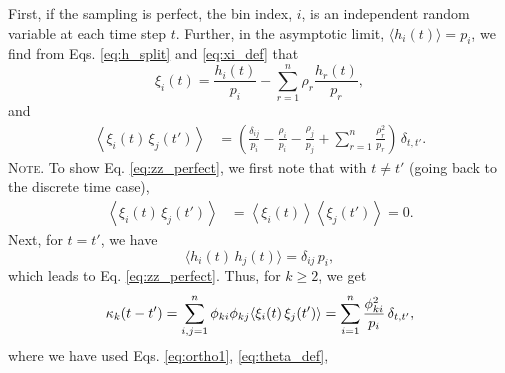 \documentclass[reprint, superscriptaddress, floatfix]{revtex4-1}
\newcommand{\note}[1]{{\color{DarkGreen}\footnotesize \textsc{Note.} #1}}
\begin{document}
First, if the sampling is perfect,
%
%
the bin index, $i$, is an independent random variable
at each time step $t$.
%
Further, in the asymptotic limit,
$\langle h_i(t) \rangle = p_i$,
we find from Eqs. \eqref{eq:h_split} and \eqref{eq:xi_def} that
\begin{equation*}
  \xi_i(t)
  =
  \frac{ h_i(t) } { p_i }
  -
  \sum_{ r = 1 }^n
    \rho_r \frac{ h_r(t) } { p_r }
  ,
\end{equation*}
%
and
%
\begin{align}
  \left\langle
    \xi_i(t) \, \xi_j(t')
  \right\rangle
  &=
  \left(
    \frac{ \delta_{ij} } { p_i }
    -
    \frac{ \rho_i } { p_i }
    -
    \frac{ \rho_j } { p_j }
    +
    \sum_{r = 1}^n
    \frac{ \rho_r^2 } { p_r }
  \right) \,
  \delta_{t, t'}
  .
\label{eq:zz_perfect}
\end{align}
%
%
\note{To show Eq. \eqref{eq:zz_perfect}, we first note that
  with $t \ne t'$ (going back to the discrete time case),
  $$
  \begin{aligned}
  \left\langle
    \xi_i(t) \, \xi_j(t')
  \right\rangle
  &=
  \left\langle
    \xi_i(t)
  \right\rangle
  \left\langle
    \xi_j(t')
  \right\rangle
  =
  0.
  \end{aligned}
  $$
  Next, for $t = t'$, we have
  $$
  \langle
    h_i(t) \, h_j(t)
  \rangle
  = \delta_{ij} \, p_i
  ,
  $$
  which leads to Eq. \eqref{eq:zz_perfect}.
}
%
Thus,
for $k \ge 2$, we get
%
\begin{equation}
  \kappa_k(t - t')
  =
  \sum_{i,j = 1}^n
  \phi_{ki} \phi_{kj}
  \langle \xi_i(t) \, \xi_j(t') \rangle
  =
  \sum_{i = 1}^n \frac{ \phi_{ki}^2 } { p_i }
  \, \delta_{t, t'},
\notag
\end{equation}
%
where we have used
Eqs. \eqref{eq:ortho1},
\eqref{eq:theta_def},
\end{document}

